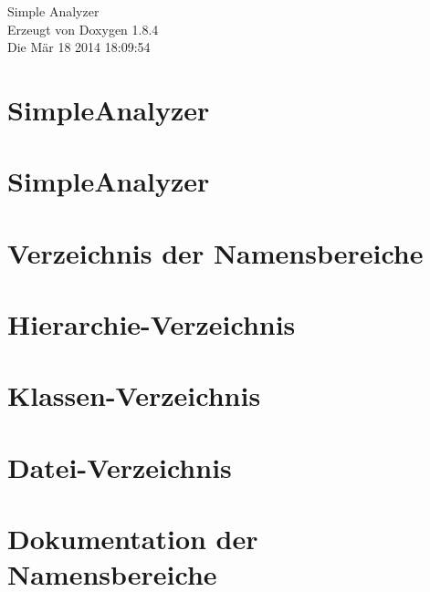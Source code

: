 \documentclass[twoside]{book}
\newcommand{\clearemptydoublepage}{%
  \newpage{\pagestyle{empty}\cleardoublepage}%
}
\begin{document}
\hypersetup{pageanchor=false}
\begin{titlepage}
\vspace*{7cm}
\begin{center}%
{\Large Simple Analyzer }\\
\vspace*{1cm}
{\large Erzeugt von Doxygen 1.8.4}\\
\vspace*{0.5cm}
{\small Die Mär 18 2014 18:09:54}\\
\end{center}
\end{titlepage}
\clearemptydoublepage
\tableofcontents
\clearemptydoublepage
{}
\hypersetup{pageanchor=true}

\chapter{Simple\-Analyzer}
\label{index}\hypertarget{index}{}
\chapter{Simple\-Analyzer}
\label{md__daten_Projekte_eclipse_workspace_README}
\hypertarget{md__daten_Projekte_eclipse_workspace_README}{}

\chapter{Verzeichnis der Namensbereiche}

\chapter{Hierarchie-\/\-Verzeichnis}

\chapter{Klassen-\/\-Verzeichnis}

\chapter{Datei-\/\-Verzeichnis}

\chapter{Dokumentation der Namensbereiche}


\end{document}
